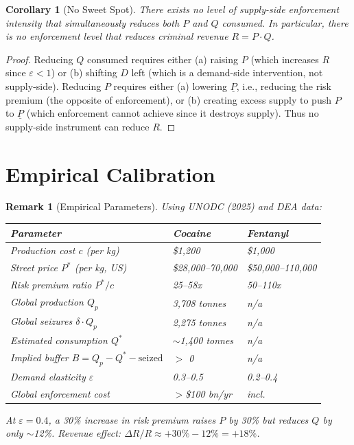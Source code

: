 \documentclass[12pt, a4paper]{article}
\newtheorem{corollary}{Corollary}
\newtheorem{remark}{Remark}
\begin{document}
\begin{corollary}[No Sweet Spot]
\label{cor:sweetspot}
There exists no level of supply-side enforcement intensity that simultaneously reduces both $P$ and $Q$ consumed. In particular, there is no enforcement level that reduces criminal revenue $R = P \cdot Q$.
\end{corollary}

\begin{proof}
Reducing $Q$ consumed requires either (a) raising $P$ (which increases $R$ since $\varepsilon < 1$) or (b) shifting $D$ left (which is a demand-side intervention, not supply-side). Reducing $P$ requires either (a) lowering $\underline{P}$, i.e., reducing the risk premium (the opposite of enforcement), or (b) creating excess supply to push $P$ to $\underline{P}$ (which enforcement cannot achieve since it destroys supply). Thus no supply-side instrument can reduce $R$.
\end{proof}

\section{Empirical Calibration}

\begin{remark}[Empirical Parameters]
Using UNODC (2025) and DEA data:
\begin{center}
\begin{tabular}{lll}
\hline
\textbf{Parameter} & \textbf{Cocaine} & \textbf{Fentanyl} \\
\hline
Production cost $c$ (per kg) & \$1,200 & \$1,000 \\
Street price $P^*$ (per kg, US) & \$28,000--70,000 & \$50,000--110,000 \\
Risk premium ratio $P^*/c$ & 25--58x & 50--110x \\
Global production $Q_p$ & 3,708 tonnes & n/a \\
Global seizures $\delta \cdot Q_p$ & 2,275 tonnes & n/a \\
Estimated consumption $Q^*$ & $\sim$1,400 tonnes & n/a \\
Implied buffer $B = Q_p - Q^* - \text{seized}$ & $>$ 0 & n/a \\
Demand elasticity $\varepsilon$ & 0.3--0.5 & 0.2--0.4 \\
Global enforcement cost & $>$\$100 bn/yr & incl. \\
\hline
\end{tabular}
\end{center}
At $\varepsilon = 0.4$, a 30\% increase in risk premium raises $P$ by 30\% but reduces $Q$ by only $\sim$12\%. Revenue effect: $\Delta R/R \approx +30\% - 12\% = +18\%$.
\end{remark}
\end{document}
